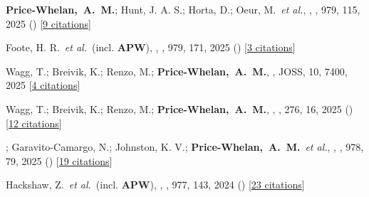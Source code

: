\item[{\color{deemph}\scriptsize137}]\textbf{Price-Whelan,~A.~M.}; Hunt, J. A. S.; Horta, D.; Oeur, M.~\textit{et al.}, , \apj, 979, 115, 2025 () [\href{http://adsabs.harvard.edu/abs/2025ApJ...979..115P}{9 citations}]

\item[{\color{deemph}\scriptsize136}]Foote, H. R.~\textit{et al.}~(incl. \textbf{APW}), , \apj, 979, 171, 2025 () [\href{http://adsabs.harvard.edu/abs/2025ApJ...979..171F}{3 citations}]

\item[{\color{deemph}\scriptsize135}]Wagg, T.; Breivik, K.; Renzo, M.; \textbf{Price-Whelan,~A.~M.}, , JOSS, 10, 7400, 2025 [\href{http://adsabs.harvard.edu/abs/2025JOSS...10.7400W}{4 citations}]

\item[{\color{deemph}\scriptsize134}]Wagg, T.; Breivik, K.; Renzo, M.; \textbf{Price-Whelan,~A.~M.}, , \apjs, 276, 16, 2025 () [\href{http://adsabs.harvard.edu/abs/2025ApJS..276...16W}{12 citations}]

\item[{\color{deemph}\scriptsize133}]; Garavito-Camargo, N.; Johnston, K. V.; \textbf{Price-Whelan,~A.~M.}~\textit{et al.}, , \apj, 978, 79, 2025 () [\href{http://adsabs.harvard.edu/abs/2025ApJ...978...79B}{19 citations}]

\item[{\color{deemph}\scriptsize132}]Hackshaw, Z.~\textit{et al.}~(incl. \textbf{APW}), , \apj, 977, 143, 2024 () [\href{http://adsabs.harvard.edu/abs/2024ApJ...977..143H}{23 citations}]

